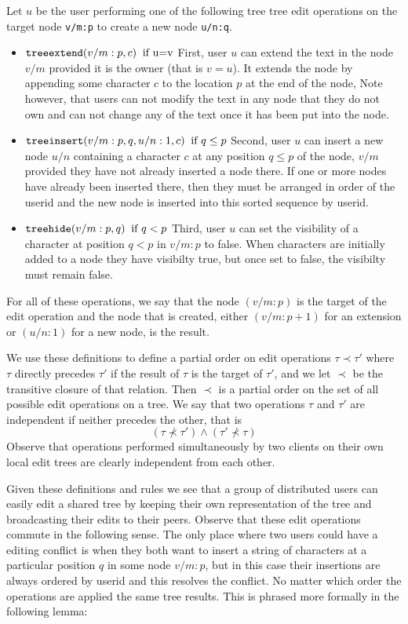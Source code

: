\documentclass{amsart}
\begin{document}
Let $u$ be the user performing one of the following tree tree edit operations
on the target node {\tt v/m:p} to create a new node {\tt u/n:q}.
\begin{itemize}
\item ${\tt treeextend}(v/m:p,c)\;\;\text{if u=v}$ \newline
First, user $u$ can extend the text in the node $v/m$
provided it is the owner (that is $v=u$). It extends the node by appending
some character $c$ to the location $p$ at the end of the node,
Note however, that users can not modify
the text in any node that they do not own and can not change any of the text
once it has been put into the node.
\item ${\tt treeinsert}(v/m:p,q,u/n:1,c) \;\; \text{if $q\le p$}$
\newline
Second, user $u$ can insert a new node $u/n$ containing a character $c$
at any position $q\le p$ of the node, 
$v/m$ provided
they have not already inserted a node there. If one or more nodes have already been inserted there, then they must be arranged in order of the userid and the new node is inserted into this sorted sequence by userid.
\item ${\tt treehide}(v/m:p,q)  \;\; \text{if $q < p$}$\newline
Third, user $u$ can set the visibility of a character at position $q < p$
in  $v/m:p$ to false.
When characters are initially added to a node they have visibilty true, but once
set to false, the visibilty must remain false. 
\end{itemize}
For all of these operations, we say that the node $(v/m:p)$ is the target of the edit operation and the node that is created, either $(v/m:p+1)$ for an extension or $(u/n:1)$ for a new node, is the result.  

We use these definitions to define a partial order on edit operations $\tau\prec\tau'$ where $\tau$ directly precedes $\tau'$ if the result of $\tau$ is the target of $\tau'$, and we let $\prec$ be the transitive closure of that relation.  Then $\prec$ is a partial order on the set of all possible edit operations on a tree. We say that two operations $\tau$ and $\tau'$ are independent if neither precedes the other, that is 
\[
\left (\tau\not\prec\tau'\right ) \wedge  \left ( \tau'\not\prec\tau \right )
\]
Observe that operations performed simultaneously by two clients on their own local edit trees are clearly independent from each other.

Given these definitions and rules we see that a group of distributed users can easily edit a 
shared tree by keeping their own representation of the tree and broadcasting
their edits to their peers. Observe that these edit operations commute in
the following sense. The only place where two users could have a editing
conflict is when they both want to insert a string of characters at a particular
position $q$ in some node $v/m:p$, but in this case their insertions are always
ordered by userid and this resolves the conflict. No matter which order the
operations are applied the same tree results. This is phrased more formally
in the following lemma:
\end{document}
